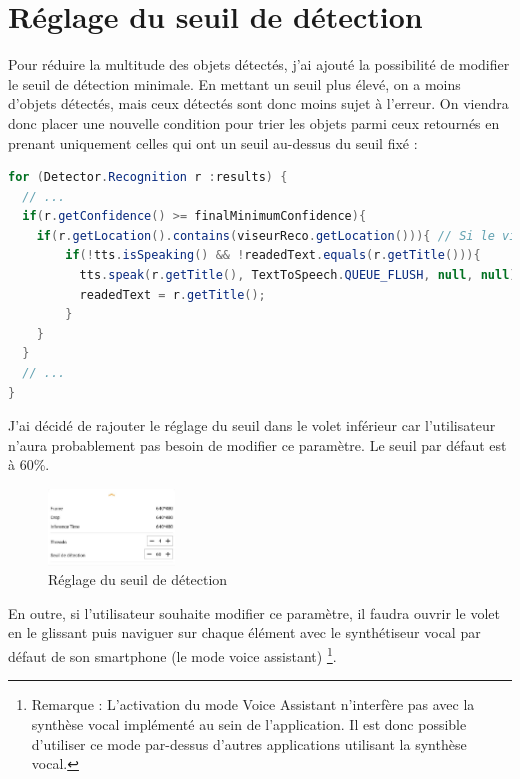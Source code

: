 \documentclass[UTF8]{EPURapport}
\begin{document}

\section{Réglage du seuil de détection}

Pour réduire la multitude des objets détectés, j'ai ajouté la possibilité de modifier le seuil de détection minimale. En mettant un seuil plus élevé, on a moins d'objets détectés, mais ceux détectés sont donc moins sujet à l'erreur. On viendra donc placer une nouvelle condition pour trier les objets parmi ceux retournés en prenant uniquement celles qui ont un seuil au-dessus du seuil fixé :\\

\begin{lstlisting}[language=Java]
for (Detector.Recognition r :results) {
  // ...
  if(r.getConfidence() >= finalMinimumConfidence){
  	if(r.getLocation().contains(viseurReco.getLocation())){ // Si le viseur est dans l'objet detecte
	    if(!tts.isSpeaking() && !readedText.equals(r.getTitle())){
	      tts.speak(r.getTitle(), TextToSpeech.QUEUE_FLUSH, null, null);
	      readedText = r.getTitle();
	    }
    }
  }
  // ...
}
\end{lstlisting}

J'ai décidé de rajouter le réglage du seuil dans le volet inférieur car l'utilisateur n'aura probablement pas besoin de modifier ce paramètre. Le seuil par défaut est à 60\%.\\

\begin{figure}[h!]
\centering
  \includegraphics[width=0.3\textwidth]{images/seuil.JPG}
  \caption{Réglage du seuil de détection}
  \label{fig:seuil}
\end{figure}

En outre, si l'utilisateur souhaite modifier ce paramètre, il faudra ouvrir le volet en le glissant puis naviguer sur chaque élément avec le synthétiseur vocal par défaut de son smartphone (le mode voice assistant) \footnote{Remarque : L'activation du mode Voice Assistant n'interfère pas avec la synthèse vocal implémenté au sein de l'application. Il est donc possible d'utiliser ce mode par-dessus d'autres applications utilisant la synthèse vocal.}.
\end{document}
